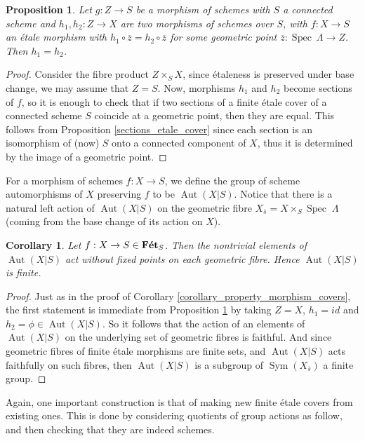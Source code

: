 \documentclass{article}
\theoremstyle{plain}
\newtheorem{proposition}[theorem]{Proposition}
\newtheorem{corollary}[theorem]{Corollary}
\theoremstyle{definition}
\DeclareMathOperator{\Aut}{Aut}
\DeclareMathOperator{\Spec}{Spec}
\DeclareMathOperator{\Sym}{Sym}
\DeclareMathOperator{\Fet}{\bf{F\acute{e}t}}
\begin{document}
\begin{proposition}
\label{proporty_mono_etale_cover}
    Let $g:Z\rightarrow S$ be a morphism of schemes with $S$ a connected scheme and $h_1,h_2: Z \rightarrow X$ are two morphisms of schemes over $S$, with $f:X\rightarrow S$ an \'etale morphism with $h_1\circ \overline{z} = h_2\circ \overline{z}$ for some geometric point $\overline{z}: \Spec\: \Lambda\rightarrow Z$. Then $h_1 = h_2$.
\end{proposition}
\begin{proof}
    Consider the fibre product $Z\times_SX$, since \'etaleness is preserved under base change, we may assume that $Z=S$. 
    Now, morphisms $h_1$ and $h_2$ become sections of $f$, so it is enough to check that 
    if two sections of a finite \'etale cover of a connected scheme $S$ coincide at a geometric point, then they are equal. 
    This follows from Proposition \ref{sections_etale_cover} since each section is an isomorphism of (now) $S$ onto a connected component of $X$, thus it is determined by the image of a geometric point.
\end{proof}



\noindent For a morphism of schemes $f:X\rightarrow S$, we define the group of scheme automorphisms of $X$ preserving $f$ to be $\Aut(X|S)$. 
Notice that there is a natural left action of $\Aut(X|S)$ on the geometric fibre $X_{\overline{s}} = X\times_S\Spec\;\Lambda$ (coming from the base change of its action on $X$).


\begin{corollary}
\label{no_fixed_points}
    Let $f: X\rightarrow S \in \Fet_S$. Then the nontrivial elements of $\Aut(X|S)$ act without fixed points on each geometric fibre. Hence $\Aut(X|S)$ is finite.
\end{corollary}
\begin{proof}
    Just as in the proof of Corollary \ref{corollary_property_morphism_covers}, the first statement is immediate from Proposition \ref{proporty_mono_etale_cover} by taking $Z=X$, $h_1 = id$ and $h_2 = \phi\in \Aut(X|S)$. So it follows that the action of an elements of $\Aut(X|S)$ on the underlying set of geometric fibres is faithful. And since geometric fibres of finite \'etale morphisms are finite sets, and $\Aut(X|S)$ acts faithfully on such fibres, then $\Aut(X|S)$ is a subgroup of $\Sym(X_{\overline{s}})$ a finite group.
\end{proof}


\noindent Again, one important construction is that of making new finite \'etale covers from existing ones. This is done by considering quotients of group actions as follow, and then checking that they are indeed schemes.
\end{document}
